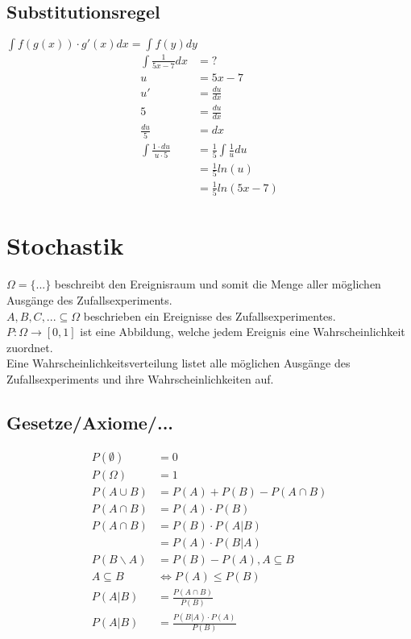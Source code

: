 \documentclass[a4paper, 8pt, landscape]{extarticle}
\let\oldint\int
\renewcommand{\int}{\ensuremath{\textstyle\oldint}}
\begin{document}
\begin{multicols*}{5}
        \subsection{Substitutionsregel}
	        $\int f(g(x)) \cdot g'(x) dx = \int f(y) dy$
	        \begin{align*}
	            \int \frac{1}{5x - 7} dx &= ?\\
	            u &= 5x-7\\
	            u' &= \frac{du}{dx} \\
	            5 &= \frac{du}{dx} \\
	            \frac{du}{5} &= dx  \\
	            \int \frac{1 \cdot du}{u \cdot 5} &= \frac{1}{5} \int \frac{1}{u} du \\
                &= \frac{1}{5} ln(u) \\
                &= \frac{1}{5} ln(5x-7)
	        \end{align*}
	\section{Stochastik}
	    $\Omega = \{ ... \}$ beschreibt den Ereignisraum und somit die Menge aller möglichen Ausgänge des Zufallsexperiments.\\
    	$A, B, C, ... \subseteq \Omega$ beschrieben ein Ereignisse des Zufallsexperimentes.\\
    	$P: \Omega \rightarrow [0,1]$ ist eine Abbildung, welche jedem Ereignis eine Wahrscheinlichkeit zuordnet.\\
    	Eine Wahrscheinlichkeitsverteilung listet alle möglichen Ausgänge des Zufallsexperiments und ihre Wahrscheinlichkeiten auf.
	    \subsection{Gesetze/Axiome/...}
		    \begin{align*}
		    	P(\emptyset) &= 0\\
		    	P(\Omega) &= 1\\
		    	P(A \cup B) &= P(A) + P(B)-P(A \cap B)\\
		    	P(A \cap B) &= P(A) \cdot P(B)\\
		    	P(A\cap B) &= P(B) \cdot P(A|B)\\
		    	&= P(A) \cdot P(B|A)\\
		    	P(B \backslash A) &= P(B) - P(A), A \subseteq B\\
		    	A \subseteq B &\iff P(A) \leq P(B)\\
		    	P(A|B) &= \frac{P(A \cap B)}{P(B)} \\
		    	P(A|B) &= \frac{P(B|A)\cdot P(A)}{P(B)} \\
	    	\end{align*}

\end{multicols*}
\end{document}
